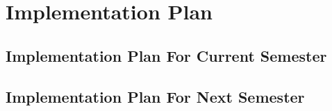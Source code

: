 
\chapter{Implementation Plan}
\section{ Implementation Plan For Current Semester}
\section{Implementation Plan For Next Semester}